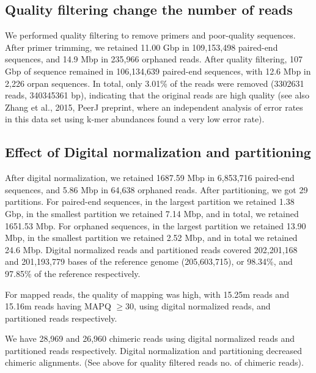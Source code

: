
\subsection*{Quality filtering change the number of reads}            

We performed quality filtering to remove primers and poor-quality
sequences. After primer trimming, we retained 11.00 Gbp in 109,153,498
paired-end sequences, and 14.9 Mbp in 235,966 orphaned reads.  After
quality filtering, 107 Gbp of sequence remained in 106,134,639
paired-end sequences, with 12.6 Mbp in 2,226 orpan sequences.  In
total, only 3.01\% of the reads were removed (3302631 reads, 340345361 bp),
indicating that the original reads are high quality (see also Zhang et
al., 2015, PeerJ preprint, where an independent analysis of error rates
in this data set using k-mer abundances found a very low error rate).

\subsection *{Effect of Digital normalization and partitioning} 

After digital normalization, we retained 
1687.59 Mbp in 6,853,716 paired-end sequences, and 5.86 Mbp in 64,638 orphaned reads. 
 After partitioning, we
got 29 partitions.  For paired-end sequences, in the largest partition we retained %
1.38 Gbp, in the smallest partition we retained 7.14 Mbp, and in total,  we retained 1651.53
Mbp.  For orphaned sequences, in the largest partition we retained 13.90
Mbp, in the smallest partition we retained 2.52 Mbp, and in total we retained 24.6 Mbp.  
Digital normalized reads and partitioned reads covered 
202,201,168 and 201,193,779  bases of the reference genome (205,603,715), or 98.34\%, and 97.85\% of the reference respectively.

For mapped reads, the quality of mapping was high, with 15.25m reads  and 15.16m reads having MAPQ $\geq 30$, using digital
normalized reads, and partitioned reads respectively.

We have 28,969 and 26,960 chimeric
reads using digital normalized reads and partitioned reads
respectively. Digital normalization and partitioning decreased
chimeric alignments. (See above for quality filtered reads no. of chimeric
reads). %

